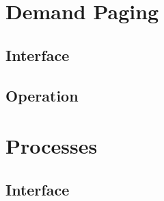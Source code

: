 \documentclass[12pt]{article}
\begin{document}
\clearpage
\section{Demand Paging}
\subsection{Interface}
\subsection{Operation}

\clearpage
\section{Processes}
\subsection{Interface}
\end{document}
